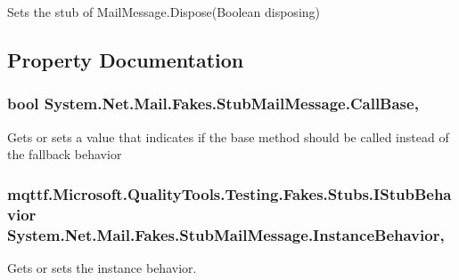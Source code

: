 Sets the stub of Mail\-Message.\-Dispose(\-Boolean disposing)



\subsection{Property Documentation}
\hypertarget{class_system_1_1_net_1_1_mail_1_1_fakes_1_1_stub_mail_message_aed51c853ca1969d6421fcd46426c8fa9}{
\subsubsection[{Call\-Base}]{\setlength{\rightskip}{0pt plus 5cm}bool System.\-Net.\-Mail.\-Fakes.\-Stub\-Mail\-Message.\-Call\-Base\hspace{0.3cm}{\ttfamily [get]}, {\ttfamily [set]}}}\label{class_system_1_1_net_1_1_mail_1_1_fakes_1_1_stub_mail_message_aed51c853ca1969d6421fcd46426c8fa9}


Gets or sets a value that indicates if the base method should be called instead of the fallback behavior

\hypertarget{class_system_1_1_net_1_1_mail_1_1_fakes_1_1_stub_mail_message_a9fb523211cacb38245cdd324b4e4508d}{
\subsubsection[{Instance\-Behavior}]{\setlength{\rightskip}{0pt plus 5cm}mqttf.\-Microsoft.\-Quality\-Tools.\-Testing.\-Fakes.\-Stubs.\-I\-Stub\-Behavior System.\-Net.\-Mail.\-Fakes.\-Stub\-Mail\-Message.\-Instance\-Behavior\hspace{0.3cm}{\ttfamily [get]}, {\ttfamily [set]}}}\label{class_system_1_1_net_1_1_mail_1_1_fakes_1_1_stub_mail_message_a9fb523211cacb38245cdd324b4e4508d}


Gets or sets the instance behavior.

